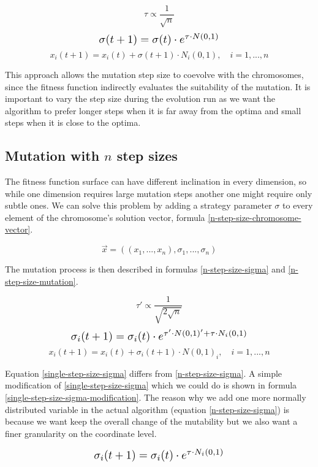 \begin{equation}
    \tau \propto \frac{1}{\sqrt{n}}
\end{equation}
\begin{equation} \label{single-step-size-sigma} \scalebox{1.3}{
    $\sigma(t+1) = \sigma(t) \cdot e^{\tau \cdot N(0,1)}$
}
\end{equation}
\begin{equation} \label{single-step-size-mutation}
    x_i(t+1) = x_i(t) + \sigma(t+1) \cdot N_i(0,1), \quad i = 1,...,n
\end{equation}

This approach allows the mutation step size to coevolve with the chromosomes, since the fitness function indirectly evaluates the suitability of the mutation. It is important to vary the step size during the evolution run as we want the algorithm to prefer longer steps when it is far away from the optima and small steps when it is close to the optima.

\subsection{Mutation with $n$ step sizes} \label{n-step}
The fitness function surface can have different inclination in every dimension, so while one dimension requires large mutation steps another one might require only subtle ones. We can solve this problem by adding a strategy parameter $\sigma$ to every element of the chromosome's solution vector, formula \ref{n-step-size-chromosome-vector}.

 \begin{equation} \label{n-step-size-chromosome-vector}
    \vec{x} = ((x_1,...,x_n), \sigma_1,...,\sigma_n)
 \end{equation}

 The mutation process is then described in formulas \ref{n-step-size-sigma} and \ref{n-step-size-mutation}.

\begin{equation}
\tau' \propto \frac{1}{\sqrt{2\sqrt{n}}}
\end{equation}
\begin{equation} \label{n-step-size-sigma} \scalebox{1.3}{
    $\sigma_i(t+1) = \sigma_i(t) \cdot e^{\tau' \cdot N(0,1)' + \tau \cdot N_i(0,1)}$
}
\end{equation}
\begin{equation} \label{n-step-size-mutation}
    x_i(t+1) = x_i(t) + \sigma_i(t+1) \cdot N(0,1)_i, \quad i = 1,...,n
\end{equation}

Equation \ref{single-step-size-sigma} differs from \ref{n-step-size-sigma}. A simple modification of \ref{single-step-size-sigma} which we could do is shown in formula \ref{single-step-size-sigma-modification}. The reason why we add one more normally distributed variable in the actual algorithm (equation \ref{n-step-size-sigma}) is because we want keep the overall change of the mutability but we also want a finer granularity on the coordinate level.

\begin{equation}\label{single-step-size-sigma-modification}
\scalebox{1.3}{
    $\sigma_i(t+1) = \sigma_i(t) \cdot e^{\tau \cdot N_i(0,1)}$
}
\end{equation}